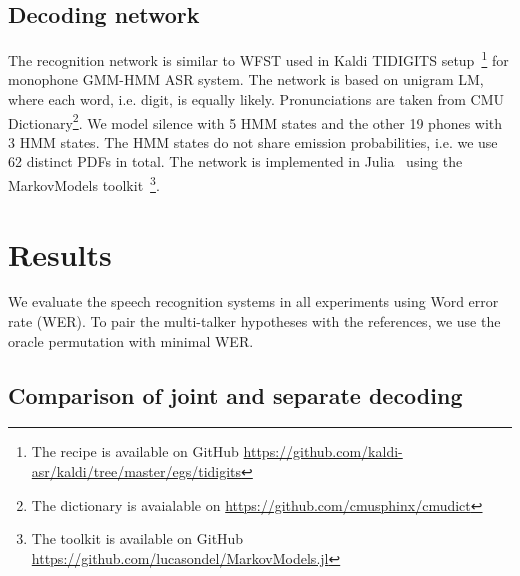 \documentclass[a4paper]{article}
\begin{document}
\subsection{Decoding network}

The recognition network is similar to WFST used in Kaldi TIDIGITS setup~\footnote{The recipe is available on GitHub \url{https://github.com/kaldi-asr/kaldi/tree/master/egs/tidigits}} for monophone GMM-HMM ASR system. The network is based on unigram LM, where each word, i.e. digit, is equally likely. Pronunciations are taken from CMU Dictionary\footnote{The dictionary is avaialable on \url{https://github.com/cmusphinx/cmudict}}. We model silence with 5 HMM states and the other 19 phones with 3 HMM states. The HMM states do not share emission probabilities, i.e. we use 62 distinct PDFs in total. The network is implemented in Julia~\cite{Julia} using the MarkovModels toolkit~\footnote{The toolkit is available on GitHub \url{https://github.com/lucasondel/MarkovModels.jl}}.


%
%

\section{Results}
\label{sec:results}

We evaluate the speech recognition systems in all experiments using Word error rate (WER). To pair the multi-talker hypotheses with the references, we use the oracle permutation with minimal WER.

\subsection{Comparison of joint and separate decoding}
\end{document}
